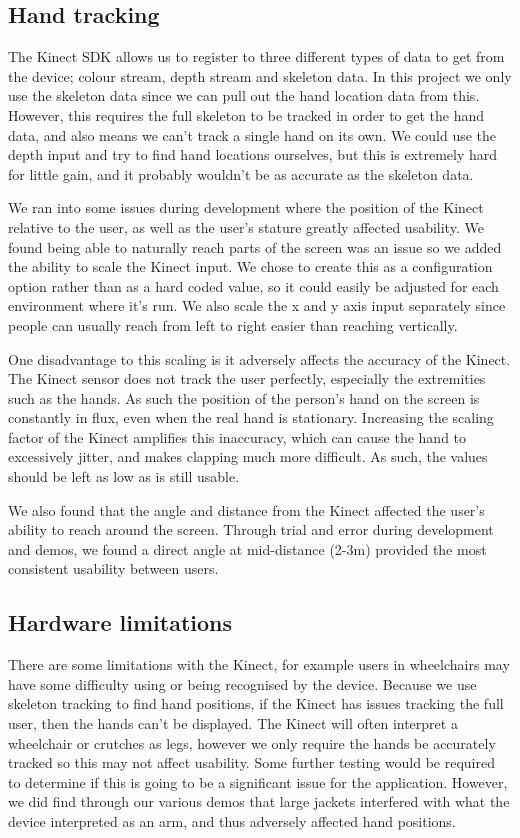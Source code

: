 \subsection{Hand tracking}
The Kinect SDK allows us to register to three different types of data to get from the device; colour stream, depth stream and skeleton data.
In this project we only use the skeleton data since we can pull out the hand location data from this.
However, this requires the full skeleton to be tracked in order to get the hand data, and also means we can't track a single hand on its own.
We could use the depth input and try to find hand locations ourselves, but this is extremely hard for little gain, and it probably wouldn't be as accurate as the skeleton data.

We ran into some issues during development where the position of the Kinect relative to the user, as well as the user's stature greatly affected usability.
We found being able to naturally reach parts of the screen was an issue so we added the ability to scale the Kinect input.
We chose to create this as a configuration option rather than as a hard coded value, so it could easily be adjusted for each environment where it's run.
We also scale the x and y axis input separately since people can usually reach from left to right easier than reaching vertically.

One disadvantage to this scaling is it adversely affects the accuracy of the Kinect.
The Kinect sensor does not track the user perfectly, especially the extremities such as the hands.
As such the position of the person's hand on the screen is constantly in flux, even when the real hand is stationary.
Increasing the scaling factor of the Kinect amplifies this inaccuracy, which can cause the hand to excessively jitter, and makes clapping much more difficult.
As such, the values should be left as low as is still usable.

We also found that the angle and distance from the Kinect affected the user's ability to reach around the screen.
Through trial and error during development and demos, we found a direct angle at mid-distance (2-3m) provided the most consistent usability between users.

\subsection{Hardware limitations}
There are some limitations with the Kinect, for example users in wheelchairs may have some difficulty using or being recognised by the device.
Because we use skeleton tracking to find hand positions, if the Kinect has issues tracking the full user, then the hands can't be displayed.
The Kinect will often interpret a wheelchair or crutches as legs, however we only require the hands be accurately tracked so this may not affect usability.
Some further testing would be required to determine if this is going to be a significant issue for the application.
However, we did find through our various demos that large jackets interfered with what the device interpreted as an arm, and thus adversely affected hand positions.

